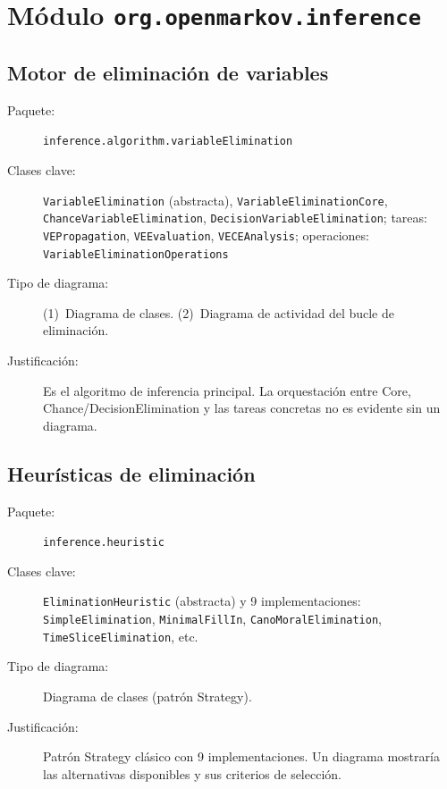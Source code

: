 \documentclass[11pt,a4paper]{article}
\newcommand{\code}[1]{\texttt{#1}}
\newcommand{\pkg}[1]{\texttt{\small #1}}
\begin{document}
\section{M\'odulo \code{org.openmarkov.inference}}

\subsection{Motor de eliminaci\'on de variables}

\begin{description}
  \item[Paquete:] \pkg{inference.algorithm.variableElimination}
  \item[Clases clave:] \code{VariableElimination} (abstracta),
        \code{VariableEliminationCore},
        \code{ChanceVariableElimination},
        \code{DecisionVariableElimination};
        tareas: \code{VEPropagation}, \code{VEEvaluation},
        \code{VECEAnalysis}; operaciones: \code{VariableEliminationOperations}
  \item[Tipo de diagrama:] (1)~Diagrama de clases. (2)~Diagrama de
        actividad del bucle de eliminaci\'on.
  \item[Justificaci\'on:] Es el algoritmo de inferencia principal.
        La orquestaci\'on entre Core, Chance/DecisionElimination y las
        tareas concretas no es evidente sin un diagrama.
\end{description}

\subsection{Heur\'isticas de eliminaci\'on}

\begin{description}
  \item[Paquete:] \pkg{inference.heuristic}
  \item[Clases clave:] \code{EliminationHeuristic} (abstracta) y 9
        implementaciones: \code{SimpleElimination},
        \code{MinimalFillIn}, \code{CanoMoralElimination},
        \code{TimeSliceElimination}, etc.
  \item[Tipo de diagrama:] Diagrama de clases (patr\'on Strategy).
  \item[Justificaci\'on:] Patr\'on Strategy cl\'asico con 9
        implementaciones.  Un diagrama mostrar\'ia las alternativas
        disponibles y sus criterios de selecci\'on.
\end{description}
\end{document}
